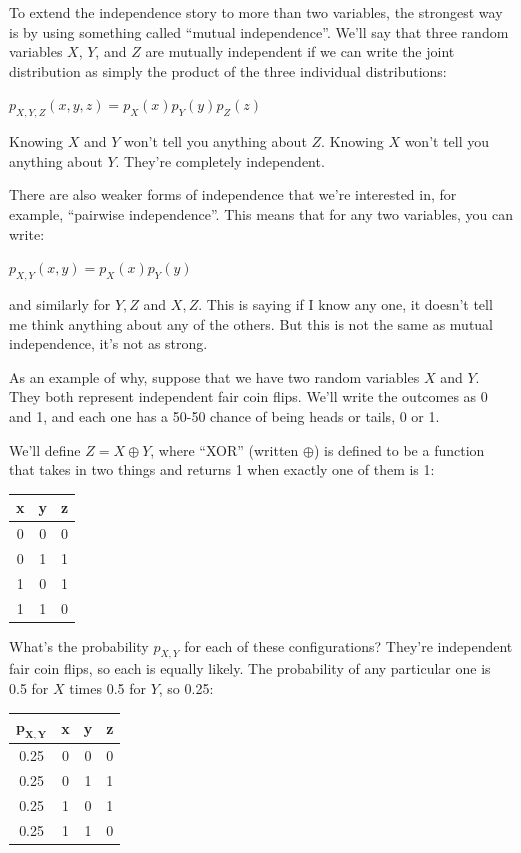 \documentclass[6008notes.tex]{subfiles}
\begin{document}
To extend the independence story to more than two variables, the strongest way is by using something called ``mutual independence''. We'll say that three random variables  $X$, $Y$, and $Z$ are mutually independent if we can write  the joint distribution as simply the product of the three individual distributions:

{\centering$p_{X,Y,Z} (x,y,z) = p_X(x) p_Y(y) p_Z(z)$ \par}

Knowing $X$ and $Y$ won't tell you anything about $Z$. Knowing $X$ won't tell you anything about $Y$. They're completely independent.

There are also weaker forms of independence that we're interested in, for example, ``pairwise independence''. This means that for any two variables, you can write:

{\centering$p_{X,Y} (x,y) = p_X(x) p_Y(y)$ \par}

and similarly for $Y,Z$ and $X,Z$. This is saying if I know any one, it doesn't tell me think anything about any of the others. But this is not the same as mutual independence, it's not as strong.

As an example of why, suppose that we have two random variables $X$ and $Y$. They both represent independent fair coin flips. We'll write the outcomes as 0 and 1, and each one has a 50-50 chance of being heads or tails, 0 or 1.

We'll define $Z = X \oplus Y$, where ``XOR'' (written $\oplus$) is defined to be a function that takes in two things and returns 1 when exactly one of them is 1:

\begin{center}
\begin{tabular}{| c | c | c }
\textbf{x} & \textbf{y} & \textbf{z} \\
\hline
0 &	0 &	0 \\
0 &	1 &	1 \\
1 &	0 &	1 \\
1 &	1 &	0 \\
\end{tabular}
\end{center}

What's the probability $p_{X,Y}$ for each of these configurations? They're independent fair coin flips, so each is equally likely. The probability of any particular one is 0.5 for $X$ times 0.5 for $Y$, so 0.25:

\begin{center}
\begin{tabular}{| c | c | c | c }
$\mathbf{p_{X,Y}}$ & \textbf{x} & \textbf{y} & \textbf{z} \\
\hline
0.25 & 0 &	0 &	0 \\
0.25 & 0 &	1 &	1 \\
0.25 & 1 &	0 &	1 \\
0.25 & 1 &	1 &	0 \\
\end{tabular}
\end{center}
\end{document}
